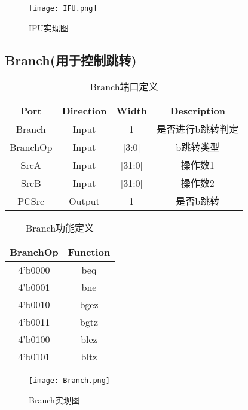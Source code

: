 \documentclass[UTF8]{ctexart}
\begin{document}
\begin{figure}[H]
	\centering
	\texttt{[image: IFU.png]}
	\caption{IFU实现图}
\end{figure}
\newpage
\subsection{Branch(用于控制跳转)}
\begin{table}[H]
	\centering
	\begin{threeparttable}
		\caption{Branch端口定义}
		\begin{tabular}{cccc}
			\toprule
			\rowcolor{mypink}
			\textbf{Port} & \textbf{Direction} & \textbf{Width} & \textbf{Description} \\
			\midrule
			Branch        & Input              & 1              & 是否进行b跳转判定    \\
			\midrule
			BranchOp      & Input              & [3:0]          & b跳转类型            \\
			\midrule
			SrcA          & Input              & [31:0]         & 操作数1              \\
			\midrule
			SrcB          & Input              & [31:0]         & 操作数2              \\
			\midrule
			PCSrc         & Output             & 1              & 是否b跳转            \\
			\midrule
		\end{tabular}
	\end{threeparttable}
\end{table}
\begin{table}[H]
	\centering
	\begin{threeparttable}
		\caption{Branch功能定义}
		\begin{tabular}{cc}
			\toprule
			\rowcolor{mypink}
			\textbf{BranchOp} & \textbf{Function} \\
			\midrule
			4'b0000           & beq               \\
			\midrule
			4'b0001           & bne               \\
			\midrule
			4'b0010           & bgez              \\
			\midrule
			4'b0011           & bgtz              \\
			\midrule
			4'b0100           & blez              \\
			\midrule
			4'b0101           & bltz              \\
			\midrule
		\end{tabular}
	\end{threeparttable}
\end{table}
\begin{figure}[H]
	\centering
	\texttt{[image: Branch.png]}
	\caption{Branch实现图}
\end{figure}
\newpage
\end{document}

